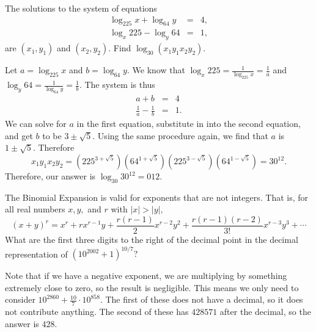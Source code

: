 \documentclass[11pt]{article}
\theoremstyle{definition}
\begin{document}
\begin{question}[name={2002 AIME I, \href{https://artofproblemsolving.com/community/c4p378359}{Problem 6}}]
	The solutions to the system of equations
	\begin{eqnarray*} \log_{225}{x}+\log_{64}{y} &=& 4,\\ \log_x{225}-\log_y{64} &=& 1, \end{eqnarray*}
	are $(x_1,y_1)$ and $(x_2, y_2).$ Find $\log_{30}{(x_1y_1x_2y_2)}.$
\end{question}


\begin{solution}[name={Solution by joml88}]
	Let $a=\log_{225}{x}$ and $b=\log_{64}{y}.$ We know that $\log_x{225}=\frac 1{\log_{225}{x}}=\frac 1a$ and $\log_y{64}=\frac 1{\log_{64}{y}}=\frac 1b.$ The system is thus
	\begin{eqnarray*} a+b &=& 4\\ \frac 1a-\frac 1b &=& 1. \end{eqnarray*}
	We can solve for $a$ in the first equation, substitute in into the second equation, and get $b$ to be $3\pm\sqrt{5}$. Using the same procedure again, we find that $a$ is $1\pm\sqrt{5}.$ Therefore $$x_1y_1x_2y_2=\left(225^{3+\sqrt{5}}\right)\left(64^{1+\sqrt{5}}\right)\left(225^{3-\sqrt{5}}\right)\left(64^{1-\sqrt{5}}\right)=30^{12}.$$ Therefore, our answer is $\log_{30}{30^{12}}=\boxed{012}.$
\end{solution}












\begin{question}[name={2002 AIME I, \href{https://artofproblemsolving.com/community/c4p378371}{Problem 7}}]
	The Binomial Expansion is valid for exponents that are not integers. That is, for all real numbers $ x, y,$ and $ r$ with $ |x| > |y|,$
	\[ (x + y)^r = x^r + rx^{r - 1}y + \frac {r(r - 1)}2x^{r - 2}y^2 + \frac {r(r - 1)(r - 2)}{3!}x^{r - 3}y^3 + \cdots
	\]
	What are the first three digits to the right of the decimal point in the decimal representation of $ \left(10^{2002} + 1\right)^{10/7}?$
\end{question}


\begin{solution}[name={Solution by OlympusHero}]
	Note that if we have a negative exponent, we are multiplying by something extremely close to zero, so the result is negligible. This means we only need to consider $10^{2860}+\frac{10}{7} \cdot 10^{858}$. The first of these does not have a decimal, so it does not contribute anything. The second of these has $428571$ after the decimal, so the answer is $\boxed{428}$.
\end{solution}
\end{document}
